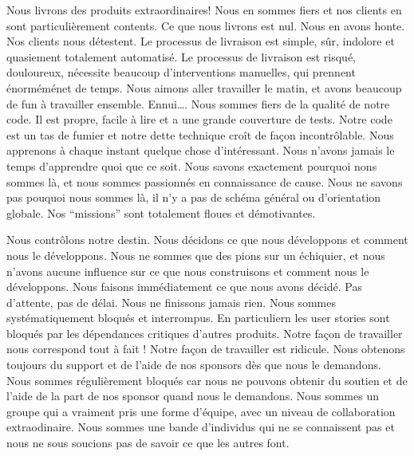 \cropmarktop%
%
  {Nous livrons des produits extraordinaires! Nous en sommes fiers et nos clients en sont particulièrement contents.}
  {Ce que nous livrons est nul. Nous en avons honte. Nos clients nous détestent.}
%
  {Le processus de livraison est simple, sûr, indolore et quasiement totalement automatisé.}
  {Le processus de livraison est risqué, douloureux, nécessite beaucoup d'interventions manuelles, qui prennent énorméménet de temps.}
%
  {Nous aimons aller travailler le matin, et avons beaucoup de fun à travailler ensemble.}
  {Ennui\ldots{}.}
%
\cropmarkmiddle%
%
  {Nous sommes fiers de la qualité de notre code. Il est propre, facile à lire et a une grande couverture de tests.}
  {Notre code est un tas de fumier et notre dette technique croît de façon incontrôlable.}
  {Nous apprenons à chaque instant quelque chose d'intéressant.}
  {Nous n'avons jamais le temps d'apprendre quoi que ce soit.}
  {Nous savons exactement pourquoi nons sommes là, et nous sommes passionnés en connaissance de cause.}
  {Nous ne savons pas pouquoi nous sommes là, il n'y a pas de schéma général  ou d'orientation globale. Nos ``missions'' sont totalement floues et démotivantes.}
%
\cropmarkbottom

\clearpage
\cropmarktop%
%
 {Nous contrôlons notre destin. Nous décidons ce que nous développons et comment nous le développons.}
 {Nous ne sommes que des pions sur un échiquier, et nous n'avons aucune influence sur ce que nous construisons et comment nous le développons.}
  {Nous faisons immédiatement ce que nous avons décidé. Pas d'attente, pas de délai.}
  {Nous ne finissons jamais rien. Nous sommes systématiquement bloqués et interrompus. En particuliern les user stories sont bloqués par les dépendances critiques d'autres produits.}
  {Notre façon de travailler nous correspond tout à fait !}
  {Notre façon de travailler est ridicule.}
%
\cropmarkmiddle%
%
  {Nous obtenons toujours du support et de l'aide de nos sponsors dès que nous le demandons.}
  {Nous sommes régulièrement bloqués car nous ne pouvons obtenir du soutien et de l'aide de la part de nos sponsor quand nous le demandons.}
%
  {Nous sommes un groupe qui a vraiment pris une forme d'équipe, avec un niveau de collaboration extraodinaire.}
  {Nous sommes une bande d'individus qui ne se connaissent pas et nous ne sous soucions pas de savoir ce que les autres font.}
%
\cropmarkbottom

